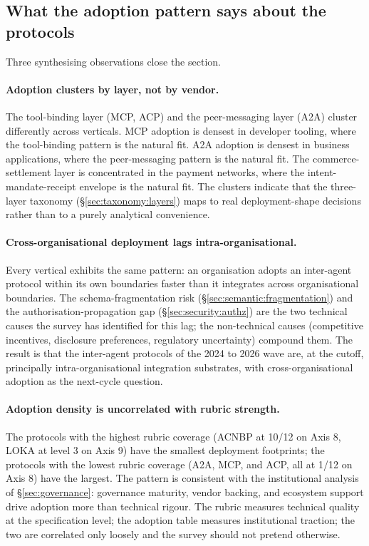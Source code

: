 \subsection{What the adoption pattern says about the protocols}
\label{sec:adoption:synthesis}

Three synthesising observations close the section.

\paragraph{Adoption clusters by layer, not by vendor.}
The tool-binding layer (MCP, ACP) and the peer-messaging
layer (A2A) cluster differently across verticals. MCP
adoption is densest in developer tooling, where the
tool-binding pattern is the natural fit. A2A adoption is
densest in business applications, where the peer-messaging
pattern is the natural fit. The commerce-settlement
layer is concentrated in the payment networks, where the
intent-mandate-receipt envelope is the natural fit. The
clusters indicate that the three-layer taxonomy
(\S\ref{sec:taxonomy:layers}) maps to real
deployment-shape decisions rather than to a purely
analytical convenience.

\paragraph{Cross-organisational deployment lags
intra-organisational.}
Every vertical exhibits the same pattern: an organisation
adopts an inter-agent protocol within its own boundaries
faster than it integrates across organisational
boundaries. The schema-fragmentation risk
(\S\ref{sec:semantic:fragmentation}) and the
authorisation-propagation gap (\S\ref{sec:security:authz})
are the two technical causes the
survey has identified for this lag; the
non-technical causes (competitive incentives,
disclosure preferences, regulatory uncertainty) compound
them. The result is that the inter-agent protocols of
the 2024 to 2026 wave are, at the cutoff, principally
intra-organisational integration substrates, with
cross-organisational adoption as the next-cycle question.

\paragraph{Adoption density is uncorrelated with rubric
strength.}
The protocols with the highest rubric coverage
(ACNBP at 10/12 on Axis 8, LOKA at level 3 on Axis 9)
have the smallest deployment footprints; the protocols
with the lowest rubric coverage (A2A, MCP, and ACP, all
at 1/12 on Axis 8) have the largest. The pattern is consistent with
the institutional analysis of \S\ref{sec:governance}:
governance maturity, vendor backing, and
ecosystem support drive adoption more than technical
rigour. The rubric measures technical quality at the
specification level; the adoption table measures
institutional traction; the two are
correlated only loosely and the survey should not pretend
otherwise.
